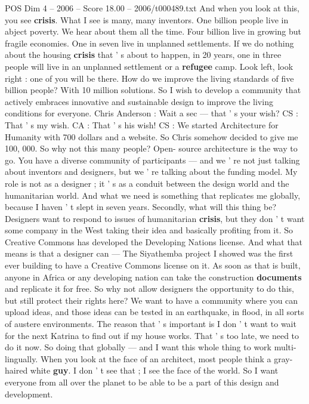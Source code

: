 \begin{textsample}{POS Dim 4 – 2006 – Score 18.00 – 2006/t000489.txt}
And when you look at this, you see \textbf{crisis}.
What I see is many, many inventors.
One billion people live in abject poverty.
We hear about them all the time.
Four billion live in growing but fragile economies.
One in seven live in unplanned settlements.
If we do nothing about the housing \textbf{crisis} that ' s about to happen, in 20 years, one in three people will live in an unplanned settlement or a \textbf{refugee} camp.
Look left, look right : one of you will be there.
How do we improve the living standards of five billion people?
With 10 million solutions.
So I wish to develop a community that actively embraces innovative and sustainable design to improve the living conditions for everyone.
Chris Anderson : Wait a sec — that ' s your wish?
CS : That ' s my wish.
CA : That ' s his wish!
CS : We started Architecture for Humanity with 700 dollars and a website.
So Chris somehow decided to give me 100, 000.
So why not this many people?
Open- source architecture is the way to go.
You have a diverse community of participants — and we ' re not just talking about inventors and designers, but we ' re talking about the funding model.
My role is not as a designer ; it ' s as a conduit between the design world and the humanitarian world.
And what we need is something that replicates me globally, because I haven ' t slept in seven years.
Secondly, what will this thing be?
Designers want to respond to issues of humanitarian \textbf{crisis}, but they don ' t want some company in the West taking their idea and basically profiting from it.
So Creative Commons has developed the Developing Nations license.
And what that means is that a designer can — The Siyathemba project I showed was the first ever building to have a Creative Commons license on it.
As soon as that is built, anyone in Africa or any developing nation can take the construction \textbf{documents} and replicate it for free.
So why not allow designers the opportunity to do this, but still protect their rights here?
We want to have a community where you can upload ideas, and those ideas can be tested in an earthquake, in flood, in all sorts of austere environments.
The reason that ' s important is I don ' t want to wait for the next Katrina to find out if my house works.
That ' s too late, we need to do it now.
So doing that globally — and I want this whole thing to work multi-lingually.
When you look at the face of an architect, most people think a gray-haired white \textbf{guy}.
I don ' t see that ; I see the face of the world.
So I want everyone from all over the planet to be able to be a part of this design and development.

\end{textsample}
